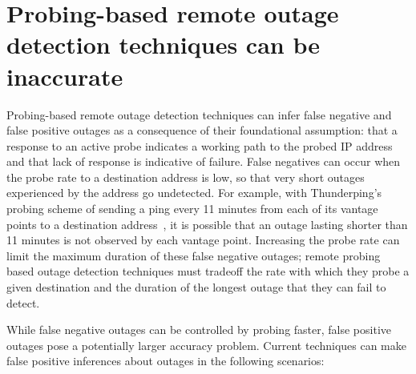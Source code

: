 
\section{Probing-based remote outage detection techniques can
be inaccurate}


Probing-based remote outage detection techniques can infer false
negative and false positive outages as a consequence of their foundational
assumption: that a response to an active probe indicates a working path to the probed
IP address and that lack of response is indicative of
failure. False negatives can occur when the probe rate
to a destination address is low, so that very short outages
experienced by the address go undetected. For example, with
Thunderping's probing scheme of sending a ping every 11 minutes from
each of its vantage points to a destination address~\cite{pingin}, it is possible that an outage lasting
shorter than 11 minutes is not observed by each vantage
point. Increasing the probe rate can limit the maximum duration
of these false negative outages; remote probing based outage detection
techniques must tradeoff the rate
with which they probe a given destination and the duration of the
longest outage that they can fail to detect. 

While false negative outages can be controlled by probing faster,
false positive outages pose a potentially larger accuracy problem. Current
techniques can make false positive inferences about
outages in the following scenarios:



